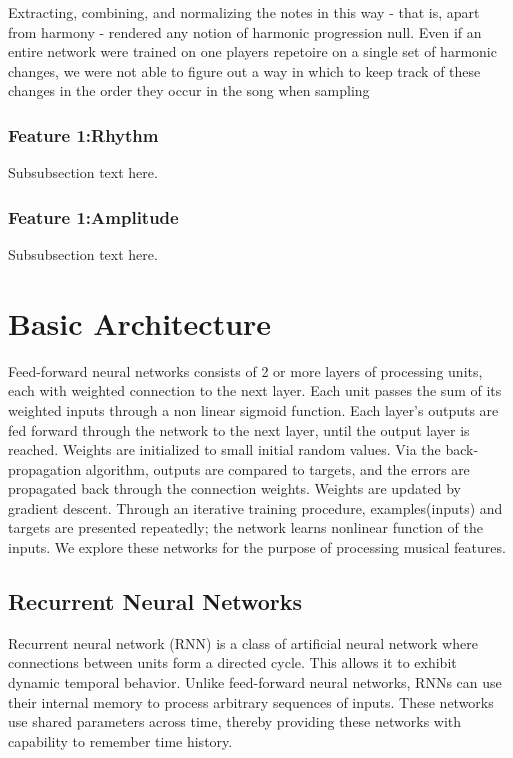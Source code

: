 \documentclass[conference]{IEEEtran}
\begin{document}
Extracting, combining, and normalizing the notes in this way - that is, apart from harmony - rendered any notion of harmonic progression null. Even if an entire network were trained on one players repetoire on a single set of harmonic changes, we were not able to figure out a way in which to keep track of these changes in the order they occur in the song when sampling 

\subsubsection{Feature 1:Rhythm} \label{f2rhythm}
Subsubsection text here.

\subsubsection{Feature 1:Amplitude} \label{f3amplitude}
Subsubsection text here.

\section{Basic Architecture}
Feed-forward neural networks consists of 2 or more layers of processing units, each with weighted connection to the next layer. Each unit passes the sum of its weighted inputs through a non linear sigmoid function. Each layer's outputs are fed forward through the network to the next layer, until the output layer is reached. Weights are initialized to small initial random values. Via the back-propagation algorithm, outputs are compared to targets, and the errors are propagated back through the connection weights. Weights are updated by gradient descent. Through an iterative training procedure, examples(inputs) and targets are presented repeatedly; the network learns nonlinear function of the inputs. We explore these networks for the purpose of processing musical features.\cite{judy1}

\subsection{Recurrent Neural Networks}
Recurrent neural network (RNN) is a class of artificial neural network where connections between units form a directed cycle. This allows it to exhibit dynamic temporal behavior. Unlike feed-forward neural networks, RNNs can use their internal memory to process arbitrary sequences of inputs. These networks use shared parameters across time, thereby providing these networks with capability to remember time history.\\
\end{document}
